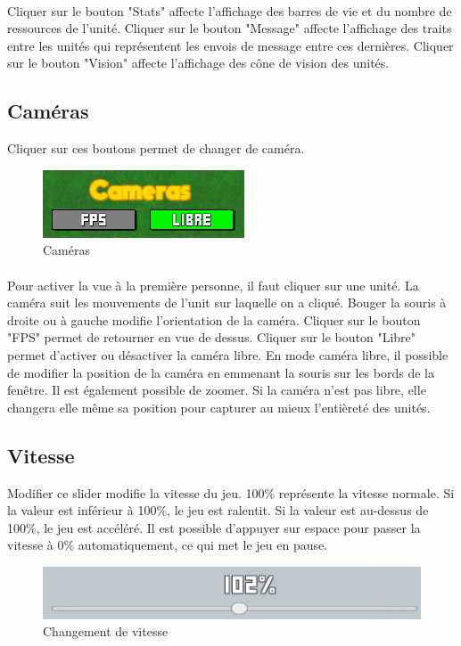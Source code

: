 \documentclass{report}
\begin{document}
\paragraph{}
Cliquer sur le bouton "Stats" affecte l'affichage des barres de vie et du nombre de ressources de l'unité. \newline
Cliquer sur le bouton "Message" affecte l'affichage des traits entre les unités qui représentent les envois de message entre ces dernières. \newline
Cliquer sur le bouton "Vision" affecte l'affichage des cône de vision des unités.

\subsection{Caméras}
Cliquer sur ces boutons permet de changer de caméra.
\begin{figure}[!h]
	\centering
		\includegraphics[scale=0.80]{camera.png}
	\caption{Caméras}
\end{figure}
\paragraph{}
Pour activer la vue à la première personne, il faut cliquer sur une unité. La caméra suit les mouvements de l'unit sur laquelle on a cliqué. Bouger la souris à droite ou à gauche modifie l'orientation de la caméra. Cliquer sur le bouton "FPS" permet de retourner en vue de dessus. \newline
Cliquer sur le bouton "Libre" permet d'activer ou désactiver la caméra libre. En mode caméra libre, il possible de modifier la position de la caméra en emmenant la souris sur les bords de la fenêtre. Il est également possible de zoomer. Si la caméra n'est pas libre, elle changera elle même sa position pour capturer au mieux l'entièreté des unités.

\subsection{Vitesse}
Modifier ce slider modifie la vitesse du jeu. 100\% représente la vitesse normale. Si la valeur est inférieur à 100\%, le jeu est ralentit. Si la valeur est au-dessus de 100\%, le jeu est accéléré. \newline
Il est possible d'appuyer sur espace pour passer la vitesse à 0\% automatiquement, ce qui met le jeu en pause.
\begin{figure}[!h]
	\centering
		\includegraphics[scale=0.80]{vitesse.png}
	\caption{Changement de vitesse}
\end{figure}
\end{document}
